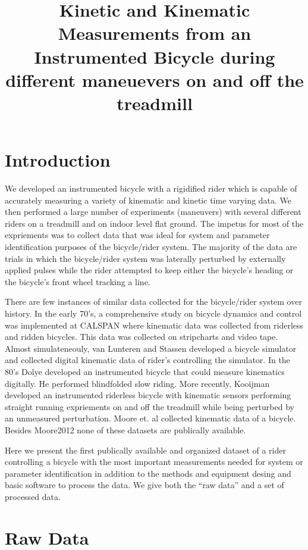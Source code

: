 \documentclass{article}
\title{Kinetic and Kinematic Measurements from an Instrumented Bicycle during
  different maneuevers on and off the treadmill}
\begin{document}
\section{Introduction}

We developed an instrumented bicycle with a rigidified rider which is capable
of accurately measuring a variety of kinematic and kinetic time varying data.
We then performed a large number of experiments (maneuvers) with several
different riders on a treadmill and on indoor level flat ground. The impetus
for most of the expriements was to collect data that was ideal for system and
parameter identification purposes of the bicycle/rider system. The majority of
the data are trials in which the bicycle/rider system was laterally perturbed
by externally applied pulses while the rider attempted to keep either the
bicycle's heading or the bicycle's front wheel tracking a line.

There are few instances of similar data collected for the bicycle/rider system
over history. In the early 70's, a comprehensive study on bicycle dynamics and
control was implemented at CALSPAN where kinematic data was collected from
riderless and ridden bicycles. This data was collected on stripcharts and video
tape. Almost simulateneouly, van Lunteren and Stassen developed a bicycle
simulator and collected digital kinematic data of rider's controlling the
simulator. In the 80's Dolye developed an instrumented bicycle that could
measure kinematics digitally. He performed blindfolded slow riding. More
recently, Kooijman developed an instrumented riderless bicycle with kinematic
sensors performing straight running expriements on and off the treadmill while
being perturbed by an unmeasured perturbation. Moore et. al collected kinematic
data of a bicycle. Besides Moore2012 none of these datasets are publically
available.


Here we present the first publically available and organized dataset of a rider
controlling a bicycle with the most important measurements needed for system or
parameter identification in addition to the methods and equipment desing and
basic software to process the data. We give both the ``raw data'' and a set of
processed data.

\section{Raw Data}
\end{document}
